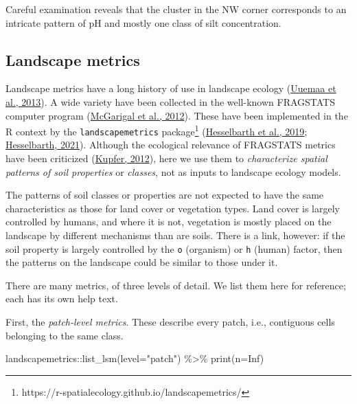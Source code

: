 \documentclass[
  letterpaper,
  DIV=11,
  numbers=noendperiod]{scrartcl}
\newenvironment{Shaded}{\begin{snugshade}}{\end{snugshade}}
\newcommand{\AttributeTok}[1]{\textcolor[rgb]{0.40,0.45,0.13}{#1}}
\newcommand{\ConstantTok}[1]{\textcolor[rgb]{0.56,0.35,0.01}{#1}}
\newcommand{\FunctionTok}[1]{\textcolor[rgb]{0.28,0.35,0.67}{#1}}
\newcommand{\NormalTok}[1]{\textcolor[rgb]{0.00,0.23,0.31}{#1}}
\newcommand{\SpecialCharTok}[1]{\textcolor[rgb]{0.37,0.37,0.37}{#1}}
\newcommand{\StringTok}[1]{\textcolor[rgb]{0.13,0.47,0.30}{#1}}
\begin{document}
Careful examination reveals that the cluster in the NW corner
corresponds to an intricate pattern of pH and mostly one class of silt
concentration.

\hypertarget{sec-lsm}{%
\subsection{Landscape metrics}\label{sec-lsm}}

Landscape metrics have a long history of use in landscape ecology
(\protect\hyperlink{ref-Uuemaa.etal2013}{Uuemaa et al., 2013}). A wide
variety have been collected in the well-known FRAGSTATS computer program
(\protect\hyperlink{ref-McGarigal.etal2012}{McGarigal et al., 2012}).
These have been implemented in the R context by the
\texttt{landscapemetrics} package\footnote{https://r-spatialecology.github.io/landscapemetrics/}
(\protect\hyperlink{ref-Hesselbarth.etal2019}{Hesselbarth et al., 2019};
\protect\hyperlink{ref-Hesselbarth2021}{Hesselbarth, 2021}). Although
the ecological relevance of FRAGSTATS metrics have been criticized
(\protect\hyperlink{ref-Kupfer2012}{Kupfer, 2012}), here we use them to
\emph{characterize spatial patterns of soil properties} or
\emph{classes}, not as inputs to landscape ecology models.

The patterns of soil classes or properties are not expected to have the
same characteristics as those for land cover or vegetation types. Land
cover is largely controlled by humans, and where it is not, vegetation
is mostly placed on the landscape by different mechanisms than are
soils. There is a link, however: if the soil property is largely
controlled by the \texttt{o} (organism) or \texttt{h} (human) factor,
then the patterns on the landscape could be similar to those under it.

There are many metrics, of three levels of detail. We list them here for
reference; each has its own help text.

First, the \emph{patch-level metrics}. These describe every patch, i.e.,
contiguous cells belonging to the same class.

\begin{Shaded}
\begin{Highlighting}[]
\NormalTok{landscapemetrics}\SpecialCharTok{::}\FunctionTok{list\_lsm}\NormalTok{(}\AttributeTok{level=}\StringTok{"patch"}\NormalTok{) }\SpecialCharTok{\%\textgreater{}\%} \FunctionTok{print}\NormalTok{(}\AttributeTok{n=}\ConstantTok{Inf}\NormalTok{)}
\end{Highlighting}
\end{Shaded}
\end{document}
